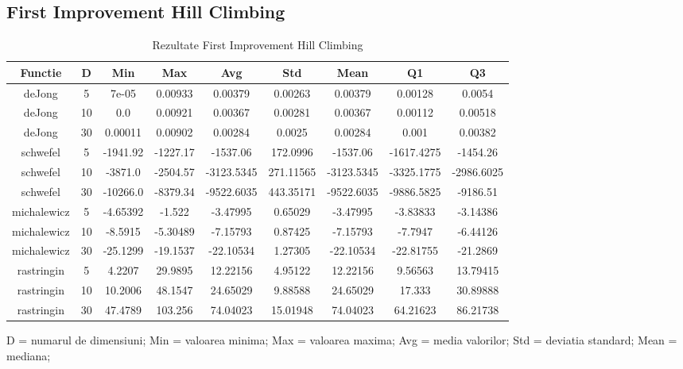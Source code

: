 \documentclass{article}
\begin{document}
\subsection{First Improvement Hill Climbing}
\begin{table}[h]
\begin{tabular}{ccccccccc}
\hline
Functie&D&Min&Max&Avg&Std&Mean&Q1&Q3\\
\hline
\hline
deJong&5&7e-05&0.00933&0.00379&0.00263&0.00379&0.00128&0.0054 \\ \hline
deJong&10&0.0&0.00921&0.00367&0.00281&0.00367&0.00112&0.00518 \\ \hline
deJong&30&0.00011&0.00902&0.00284&0.0025&0.00284&0.001&0.00382 \\ \hline
\hline
schwefel&5&-1941.92&-1227.17&-1537.06&172.0996&-1537.06&-1617.4275&-1454.26 \\ \hline
schwefel&10&-3871.0&-2504.57&-3123.5345&271.11565&-3123.5345&-3325.1775&-2986.6025 \\ \hline
schwefel&30&-10266.0&-8379.34&-9522.6035&443.35171&-9522.6035&-9886.5825&-9186.51 \\ \hline
\hline
michalewicz&5&-4.65392&-1.522&-3.47995&0.65029&-3.47995&-3.83833&-3.14386 \\ \hline
michalewicz&10&-8.5915&-5.30489&-7.15793&0.87425&-7.15793&-7.7947&-6.44126 \\ \hline
michalewicz&30&-25.1299&-19.1537&-22.10534&1.27305&-22.10534&-22.81755&-21.2869 \\ \hline
\hline
rastringin&5&4.2207&29.9895&12.22156&4.95122&12.22156&9.56563&13.79415 \\ \hline
rastringin&10&10.2006&48.1547&24.65029&9.88588&24.65029&17.333&30.89888 \\ \hline
rastringin&30&47.4789&103.256&74.04023&15.01948&74.04023&64.21623&86.21738 \\ \hline
\hline
\end{tabular}
\caption{Rezultate First Improvement Hill Climbing} \footnotesize{D = numarul de dimensiuni}; {Min = valoarea minima}; {Max = valoarea maxima}; {Avg = media valorilor}; {Std = deviatia standard}; {Mean = mediana};
\end{table}
\end{document}
